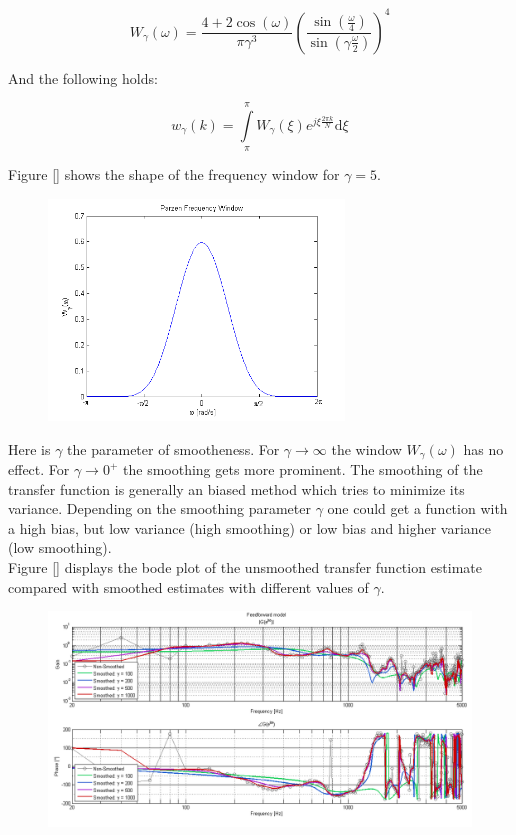 \[W_\gamma(\omega) = \frac{4+2\cos(\omega)}{\pi \gamma^3}\left( \frac{\sin(\frac{\omega}{4})}{\sin(\gamma\frac{\omega}{2})}\right)^4 \]

And the following holds:

\[w_\gamma(k) = \int\limits_\pi^\pi W_\gamma(\xi)e^{j\xi \frac{2\pi k}{N}}\text{d}\xi\]

Figure \ref{} shows the shape of the frequency window for $\gamma = 5$.


\begin{figure}[H]
\centering
\includegraphics[width=0.7\textwidth]{pics/parzen}
\caption{}
\label{pic:}
\end{figure}



Here is $\gamma$ the parameter of smootheness. For $\gamma \rightarrow \infty$ the window $W_\gamma(\omega)$ has no effect. For $\gamma \rightarrow 0^+$ the smoothing gets more prominent. The smoothing of the transfer function is generally an biased method which tries to minimize its variance. Depending on the smoothing parameter $\gamma$ one could get a function with a high bias, but low variance (high smoothing) or low bias and higher variance (low smoothing). \\

Figure \ref{} displays the bode plot of the unsmoothed transfer function estimate compared with smoothed estimates with different values of $\gamma$.


\begin{figure}[H]
\centering
\includegraphics[width=1.0\textwidth]{pics/FF_Smoothing}
\caption{}
\label{pic:}
\end{figure}



